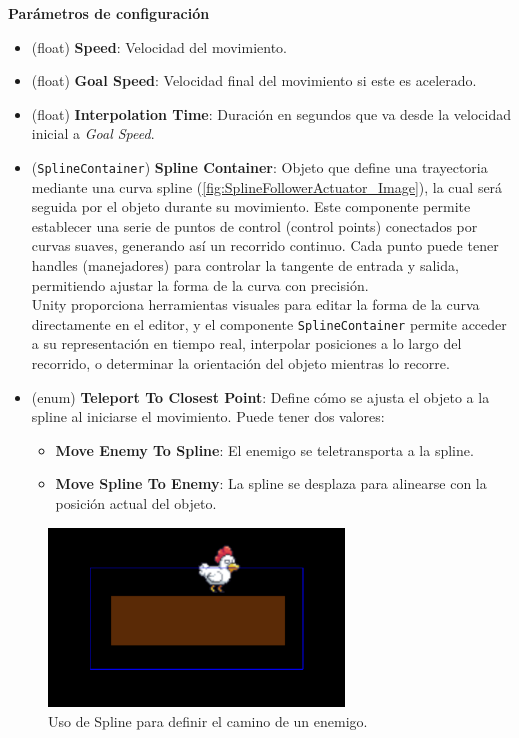 \textbf{Parámetros de configuración}
\begin{itemize}
	\item (float) \textbf{Speed}: Velocidad del movimiento.
	\item (float) \textbf{Goal Speed}: Velocidad final del movimiento si este es acelerado.
	\item (float) \textbf{Interpolation Time}: Duración en segundos que va desde la velocidad inicial a \textit{Goal Speed}.
	\item (\texttt{SplineContainer}) \textbf{Spline Container}: Objeto que define una trayectoria mediante una curva spline (\autoref{fig:SplineFollowerActuator_Image}), la cual será seguida por el objeto durante su movimiento. Este componente permite establecer una serie de puntos de control (control points) conectados por curvas suaves, generando así un recorrido continuo. Cada punto puede tener handles (manejadores) para controlar la tangente de entrada y salida, permitiendo ajustar la forma de la curva con precisión.\\
Unity proporciona herramientas visuales para editar la forma de la curva directamente en el editor, y el componente \texttt{SplineContainer} permite acceder a su representación en tiempo real, interpolar posiciones a lo largo del recorrido, o determinar la orientación del objeto mientras lo recorre.
	\item (enum) \textbf{Teleport To Closest Point}: Define cómo se ajusta el objeto a la spline al iniciarse el movimiento. Puede tener dos valores:
	\begin{itemize}
		\item \textbf{Move Enemy To Spline}: El enemigo se teletransporta a la spline.
		\item \textbf{Move Spline To Enemy}: La spline se desplaza para alinearse con la posición actual del objeto.
	\end{itemize}
\end{itemize}

\begin{figure}[t]
	\centering
	\includegraphics[width = 0.7\textwidth]{Imagenes/SplineFollowerActuator.png}
	\caption{Uso de Spline para definir el camino de un enemigo.}
	\label{fig:SplineFollowerActuator_Image}
\end{figure}

